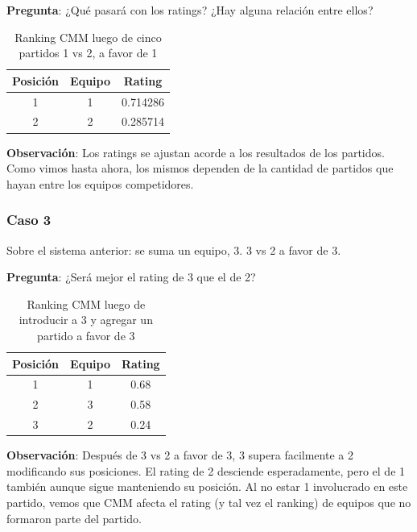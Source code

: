 \textbf{Pregunta}: ¿Qué pasará con los ratings? ¿Hay alguna relación entre ellos?

\begin{table}[h!]
    \begin{center}
        \begin{tabular}{|c|c|c|}
        \hline
        \textbf{Posición} & \textbf{Equipo} & \textbf{Rating} \\
        \hline
        1 & 1 & 0.714286\\
        2 & 2 & 0.285714\\
        \hline
        \end{tabular}
        \caption{Ranking CMM luego de cinco partidos 1 vs 2, a favor de 1}
        \label{cmm_caso_2}
    \end{center}
\end{table}

\textbf{Observación}: Los ratings se ajustan acorde a los resultados de los partidos. Como vimos hasta ahora, los mismos dependen de la cantidad de partidos que hayan entre los equipos competidores.

\subsubsection*{Caso 3}

Sobre el sistema anterior: se suma un equipo, 3. 3 vs 2 a favor de 3.

\textbf{Pregunta}: ¿Será mejor el rating de 3 que el de 2?

\begin{table}[h!]
    \begin{center}
        \begin{tabular}{|c|c|c|}
        \hline
        \textbf{Posición} & \textbf{Equipo} & \textbf{Rating} \\
        \hline
        1 & 1 & 0.68\\
        2 & 3 & 0.58\\
        3 & 2 & 0.24\\
        \hline
        \end{tabular}
        \caption{Ranking CMM luego de introducir a 3 y agregar un partido a favor de 3}
        \label{cmm_caso_3}
    \end{center}
\end{table}

\textbf{Observación}: Después de 3 vs 2 a favor de 3, 3 supera facilmente a 2 modificando sus posiciones. El rating de 2 desciende esperadamente, pero el de 1 también aunque sigue manteniendo su posición. Al no estar 1 involucrado en este partido, vemos que CMM afecta el rating (y tal vez el ranking) de equipos que no formaron parte del partido.

